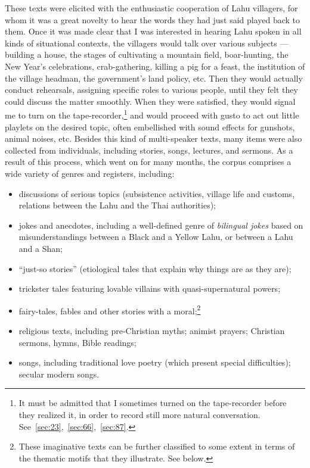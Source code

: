 These texts were elicited with the enthusiastic cooperation of Lahu
villagers, for whom it was a great novelty to hear the words they had
just said played back to them. Once it was made clear that I was
interested in hearing Lahu spoken in all kinds of situational
contexts, the villagers would talk over various subjects --- building a
house, the stages of cultivating a mountain field, boar-hunting, the
New Year's celebrations, crab-gathering, killing a pig for a feast,
the institution of the village headman, the government's land
policy, etc. Then they would actually conduct rehearsals, assigning
specific roles to various people, until they felt they could discuss
the matter smoothly.  When they were satisfied, they would signal me
to turn on the tape-recorder,\footnote{It must be admitted that I
  sometimes turned on the tape-recorder before they realized it, in
  order to record still more natural
  conversation. See~\ref{sec:23},~\ref{sec:66},~\ref{sec:87}.} and
would proceed with gusto to act out little playlets on the desired
topic, often embellished with sound effects for gunshots, animal
noises, etc. Besides this kind of multi-speaker texts, many items were
also collected from individuals, including stories, songs, lectures,
and sermons. As a result of this process, which went on for many
months, the corpus comprises a wide variety of genres and registers,
including:

\begin{itemize}
\item discussions of serious topics (subsistence activities, village
life and customs, relations between the Lahu and the Thai authorities);

\item jokes and anecdotes, including a well-defined genre of
\emph{bilingual jokes} based on misunderstandings between a Black and a
Yellow Lahu, or between a Lahu and a Shan;
\item ``just-so stories'' (etiological tales that explain why things are as they are);
\item trickster tales featuring lovable villains with
  quasi-supernatural powers;
\item fairy-tales, fables and other
stories with a moral;\footnote{These imaginative texts
  can be further classified to some extent in terms of the thematic
  motifs that they illustrate. See below.}

\item religious texts, including pre-Christian myths; animist prayers;
Christian sermons, hymns, Bible readings;

\item songs, including traditional love poetry (which present special
difficulties); secular modern songs.
\end{itemize}

